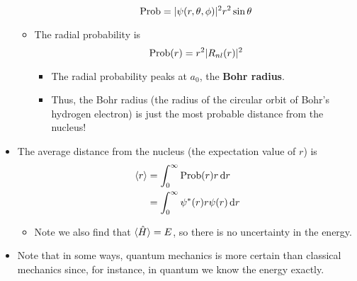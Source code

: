 \documentclass[../notes.tex]{subfiles}
\begin{document}
\begin{itemize}
\begin{itemize}
\begin{equation*}
            \operatorname{Prob} = |\psi(r,\theta,\phi)|^2r^2\sin\theta
        \end{equation*}
        \item The radial probability is
        \begin{equation*}
            \operatorname{Prob}(r) = r^2|R_{nl}(r)|^2
        \end{equation*}
        \begin{itemize}
            \item The radial probability peaks at $a_0$, the \textbf{Bohr radius}.
            \item Thus, the Bohr radius (the radius of the circular orbit of Bohr's hydrogen electron) is just the most probable distance from the nucleus!
        \end{itemize}
    \end{itemize}
    \item The average distance from the nucleus (the expectation value of $r$) is
    \begin{align*}
        \langle{r}\rangle &= \int_0^\infty\operatorname{Prob}(r)r\dd{r}\\
        &= \int_0^\infty\psi^*(r)r\psi(r)\dd{r}
    \end{align*}
    \begin{itemize}
        \item Note we also find that $\langle{\hat{H}}\rangle=E$, so there is no uncertainty in the energy.
    \end{itemize}
    \item Note that in some ways, quantum mechanics is more certain than classical mechanics since, for instance, in quantum we know the energy exactly.
\end{itemize}
\end{document}
